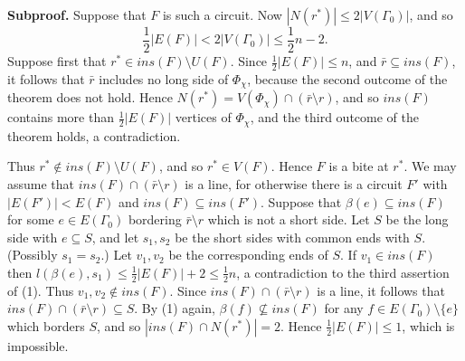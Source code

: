 \textbf{Subproof.} Suppose that $F$ is such a circuit. Now $|N(r^*)| \le 2|V(\Gamma_0)|$, and so
\begin{equation*}
\frac{1}{2}|E(F)| < 2|V(\Gamma_0)| \le \frac{1}{2}n - 2.
\end{equation*}
Suppose first that $r^* \in ins(F)\setminus U(F)$. Since $\frac{1}{2}|E(F)| \le n$, and $\bar{r} \subseteq ins(F)$, it follows that $\bar{r}$ includes no long side of $\Phi_\chi$, because the second outcome of the theorem does not hold. Hence $N(r^*) = V(\Phi_\chi) \cap (\bar{r}\setminus r)$, and so $ins(F)$ contains more than $\frac{1}{2}|E(F)|$ vertices of $\Phi_\chi$, and the third outcome of the theorem holds, a contradiction.

Thus $r^* \notin ins(F)\setminus U(F)$, and so $r^* \in V(F)$. Hence $F$ is a bite at $r^*$. We may assume that $ins(F) \cap (\bar{r}\setminus r)$ is a line, for otherwise there is a circuit $F'$ with $|E(F')| < E(F)$ and $ins(F) \subseteq ins(F')$. Suppose that $\beta(e) \subseteq ins(F)$ for some $e \in E(\Gamma_0)$ bordering $\bar{r}\setminus r$ which is not a short side. Let $S$ be the long side with $e \subseteq S$, and let $s_1, s_2$ be the short sides with common ends with $S$. (Possibly $s_1 = s_2$.) Let $v_1, v_2$ be the corresponding ends of $S$. If $v_1 \in ins(F)$ then $l(\beta(e), s_1) \le \frac{1}{2}|E(F)| + 2 \le \frac{1}{2}n$, a contradiction to the third assertion of (1). Thus $v_1, v_2 \notin ins(F)$. Since $ins(F) \cap (\bar{r}\setminus r)$ is a line, it follows that $ins(F) \cap (\bar{r}\setminus r) \subseteq S$. By (1) again, $\beta(f) \nsubseteq ins(F)$ for any $f \in E(\Gamma_0)\setminus \{e\}$ which borders $S$, and so $|ins(F) \cap N(r^*)| = 2$. Hence $\frac{1}{2}|E(F)| \le 1$, which is impossible.
